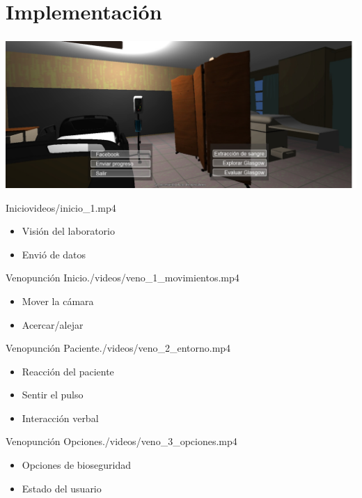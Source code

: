 \section{Implementación}
\setcounter{sectiontotal}{11}

\iflinux
    
\else
    
\fi

\begin{frame}
\frametitle{\pagetitle}
\includegraphics[width=\textwidth]{../solucion/images/pantalla_inicio.jpg}%
\end{frame}

\begin{step}{Inicio}{videos/inicio_1.mp4}
\begin{itemize}
    \item Visión del laboratorio
    \item Envió de datos
\end{itemize}
\end{step}

\begin{step}{Venopunción Inicio}{./videos/veno_1_movimientos.mp4}
\begin{itemize}
    \item Mover la cámara
    \item Acercar/alejar
\end{itemize}
\end{step}

\begin{step}{Venopunción Paciente}{./videos/veno_2_entorno.mp4}
\begin{itemize}
    \item Reacción del paciente
    \item Sentir el pulso
    \item Interacción verbal
\end{itemize}
\end{step}

\begin{step}{Venopunción Opciones}{./videos/veno_3_opciones.mp4}
\begin{itemize}
    \item Opciones de bioseguridad
    \item Estado del usuario
\end{itemize}
\end{step}

